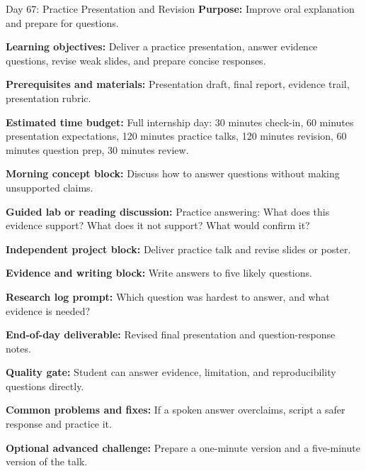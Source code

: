 \begin{dailybox}{Day 67: Practice Presentation and Revision}
\textbf{Purpose:} Improve oral explanation and prepare for questions.

\textbf{Learning objectives:} Deliver a practice presentation, answer evidence questions, revise weak slides, and prepare concise responses.

\textbf{Prerequisites and materials:} Presentation draft, final report, evidence trail, presentation rubric.

\textbf{Estimated time budget:} Full internship day: 30 minutes check-in, 60 minutes presentation expectations, 120 minutes practice talks, 120 minutes revision, 60 minutes question prep, 30 minutes review.

\textbf{Morning concept block:} Discuss how to answer questions without making unsupported claims.

\textbf{Guided lab or reading discussion:} Practice answering: What does this evidence support? What does it not support? What would confirm it?

\textbf{Independent project block:} Deliver practice talk and revise slides or poster.

\textbf{Evidence and writing block:} Write answers to five likely questions.

\textbf{Research log prompt:} Which question was hardest to answer, and what evidence is needed?

\textbf{End-of-day deliverable:} Revised final presentation and question-response notes.

\textbf{Quality gate:} Student can answer evidence, limitation, and reproducibility questions directly.

\textbf{Common problems and fixes:} If a spoken answer overclaims, script a safer response and practice it.

\textbf{Optional advanced challenge:} Prepare a one-minute version and a five-minute version of the talk.
\end{dailybox}


